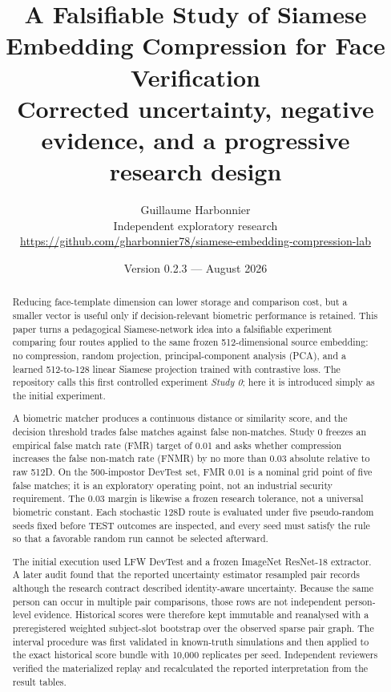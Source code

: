 \documentclass[10pt,a4paper]{article}
\title{\textbf{A Falsifiable Study of Siamese Embedding Compression for Face Verification}\\[5pt]
\large Corrected uncertainty, negative evidence, and a progressive research design}
\author{Guillaume Harbonnier\\
\small Independent exploratory research\\
\small \url{https://github.com/gharbonnier78/siamese-embedding-compression-lab}}
\date{Version 0.2.3 --- August 2026}
\begin{document}
\maketitle
\thispagestyle{empty}

\begin{center}
\end{center}

\begin{abstract}
Reducing face-template dimension can lower storage and comparison cost, but a smaller vector
is useful only if decision-relevant biometric performance is retained. This paper turns a
pedagogical Siamese-network idea into a falsifiable experiment comparing four routes applied
to the same frozen 512-dimensional source embedding: no compression, random projection,
principal-component analysis (PCA), and a learned 512-to-128 linear Siamese projection
trained with contrastive loss. The repository calls this first controlled experiment
\emph{Study 0}; here it is introduced simply as the initial experiment.

A biometric matcher produces a continuous distance or similarity score, and the decision
threshold trades false matches against false non-matches. Study 0 freezes an empirical false
match rate (FMR) target of 0.01 and asks whether compression increases the false non-match
rate (FNMR) by no more than 0.03 absolute relative to raw 512D. On the 500-impostor DevTest
set, FMR 0.01 is a nominal grid point of five false matches; it is an exploratory operating
point, not an industrial security requirement. The 0.03 margin is likewise a frozen research
tolerance, not a universal biometric constant. Each stochastic 128D route is evaluated under
five pseudo-random seeds fixed before TEST outcomes are inspected, and every seed must satisfy
the rule so that a favorable random run cannot be selected afterward.

The initial execution used LFW DevTest and a frozen ImageNet ResNet-18 extractor. A later
audit found that the reported uncertainty estimator resampled pair records although the
research contract described identity-aware uncertainty. Because the same person can occur in
multiple pair comparisons, those rows are not independent person-level evidence. Historical
scores were therefore kept immutable and reanalysed with a preregistered weighted
subject-slot bootstrap over the observed sparse pair graph. The interval procedure was first
validated in known-truth simulations and then applied to the exact historical score bundle
with 10,000 replicates per seed. Independent reviewers verified the materialized replay and
recalculated the reported interpretation from the result tables.


\end{abstract}
\end{document}
